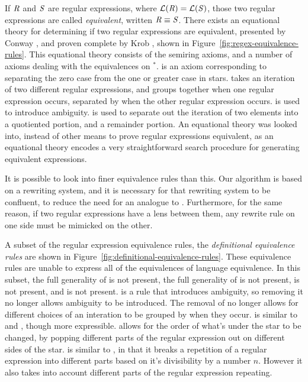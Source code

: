 \documentclass[numbers]{sigplanconf}
\begin{document}
If $\mathit{R}$ and $\mathit{S}$ are regular expressions, where
$\mathcal{L}(\mathit{R})=\mathcal{L}(\mathit{S})$, those two regular expressions
are called \textit{equivalent}, written $\mathit{R}\equiv\mathit{S}$.
There exists an equational theory for determining if two regular expressions
are equivalent, presented by Conway \cite{conway}, and proven complete by Krob
\cite{Krob}, shown in Figure~\ref{fig:regex-equivalence-rules}.  This equational
theory consists of the semiring axioms, and a number of axioms dealing with the
equivalences on $^*$.  \ProductstarRule{} is an axiom corresponding to separating the
zero case from the one or greater case in stars.  \SumstarRule{} takes an iteration of two
different regular expressions, and groups together when one regular expression occurs,
separated by when the other regular expression occurs.  \StarstarRule{} is used
to 
introduce ambiguity.  \DicyclicityRule{} is used to separate out the iteration
of two elements into a quotiented portion, and a remainder portion.  An
equational theory was looked into, instead of other means to prove regular
expressions equivalent, as an equational theory encodes a very straightforward
search procedure for generating equivalent expressions.

It is possible to look into finer equivalence rules than this.
Our algorithm is based on a rewriting system, and it is necessary for that
rewriting system to be confluent, to reduce the need for an analogue to
\ComposeLensRule{}.  Furthermore, for the same reason, if two regular
expressions have a lens between them, any rewrite rule on one side must be
mimicked on the other.

A subset of
the regular expression equivalence rules, the \textit{definitional equivalence
  rules} are shown in
Figure~\ref{fig:definitional-equivalence-rules}.  These equivalence rules are
unable to express all of the equivalences of language equivalence.  In this
subset, the full generality of \SumstarRule{} is not present, the full
generality of \DicyclicityRule{} is not present, \StarstarRule{} is not present,
and \SumstarRule{} is not present.  \StarstarRule{} is a rule that introduces
ambiguity, so removing it no longer allows ambiguity to be introduced.
  The
removal of \SumstarRule{} no longer allows for different choices of an
interation to be grouped by when they occur.  \ProductstarRule{} is similar to
\UnrollstarLeftRule{} and \UnrollstarRightRule{}, though more expressible.
\ProductstarRule{}
allows for the order of what's under the star to be changed, by popping
different parts of the regular expression out on different sides of the star.
\DicyclicityRule{} is
similar to \QuotientstarRule{}, in that it breaks a repetition of a regular
expression into different parts based on it's divisibility by a number $n$.  However
it also takes into account different parts of the regular expression repeating.
\end{document}
